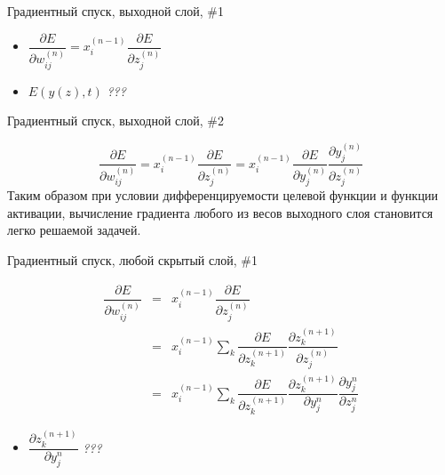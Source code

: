 \documentclass[10pt]{beamer}
\begin{document}
\begin{frame}[t]{Градиентный спуск, выходной слой, \#1}

\begin{itemize}
	\item $\dfrac{\partial E}{\partial w^{(n)}_{ij}} = x_i^{(n - 1)} \dfrac{\partial E}{\partial z^{(n)}_j}$
	\item $E\left(y(z), t\right)$ \textit{???}
\end{itemize}

\end{frame}


\begin{frame}{Градиентный спуск, выходной слой, \#2}

\begin{equation}\label{eq:de_dw_output}
	\dfrac{\partial E}{\partial w^{(n)}_{ij}} = x_i^{(n - 1)} \dfrac{\partial E}{\partial z^{(n)}_j} = x_i^{(n - 1)} \dfrac{\partial E}{\partial y^{(n)}_j} \dfrac{\partial y^{(n)}_j}{\partial z^{(n)}_j}
\end{equation}
Таким образом при условии дифференцируемости целевой функции и функции активации, вычисление градиента любого из весов выходного слоя становится легко решаемой задачей. 

\end{frame}


\begin{frame}[t]{Градиентный спуск, любой скрытый слой, \#1}


\begin{eqnarray*}
	\dfrac{\partial E}{\partial w^{(n)}_{ij}} &=& x^{(n - 1)}_i \dfrac{\partial E}{\partial z^{(n)}_j} \\
	&=& x^{(n - 1)}_i \sum_k \dfrac{\partial E}{\partial z^{(n + 1)}_k} \dfrac{\partial z^{(n + 1)}_k}{\partial z^{(n)}_j} \\
	&=& x^{(n - 1)}_i \sum_k \dfrac{\partial E}{\partial z^{(n + 1)}_k} \dfrac{\partial z^{(n + 1)}_k}{\partial y^{n}_{j}} \dfrac{\partial y^{n}_{j}}{\partial z^{n}_{j}}
\end{eqnarray*}

\begin{itemize}
	\item $\dfrac{\partial z^{(n + 1)}_k}{\partial y^{n}_{j}}$ \textit{???}
\end{itemize}

\end{frame}
\end{document}
